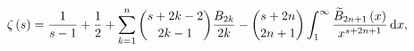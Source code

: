 \[\zeta\left(s\right)=\frac{1}{s-1}+\frac{1}{2}+\sum_{k=1}^{n}\genfrac{(}{)}{0.0%
pt}{}{s+2k-2}{2k-1}\frac{B_{2k}}{2k}-\genfrac{(}{)}{0.0pt}{}{s+2n}{2n+1}\int_{%
1}^{\infty}\frac{\widetilde{B}_{2n+1}\left(x\right)}{x^{s+2n+1}}\,\mathrm{d}x,\]